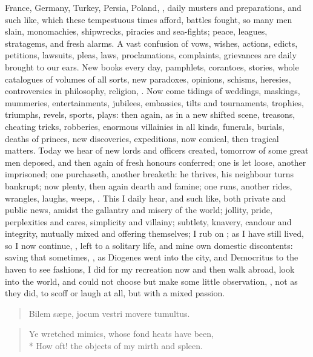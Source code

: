 {France, Germany, Turkey, Persia, Poland, \etc, daily musters and
preparations, and such like, which these tempestuous times afford,
battles fought, so many men slain, monomachies, shipwrecks, piracies
and sea-fights; peace, leagues, stratagems, and fresh alarms. A vast
confusion of vows, wishes, actions, edicts, petitions, lawsuits, pleas,
laws, proclamations, complaints, grievances are daily brought to our
ears. New books every day, pamphlets, corantoes, stories, whole
catalogues of volumes of all sorts, new paradoxes, opinions, schisms,
heresies, controversies in philosophy, religion, \etc. Now come tidings
of weddings, maskings, mummeries, entertainments, jubilees, embassies,
tilts and tournaments, trophies, triumphs, revels, sports, plays: then
again, as in a new shifted scene, treasons, cheating tricks, robberies,
enormous villainies in all kinds, funerals, burials, deaths of princes,
new discoveries, expeditions, now comical, then tragical matters. Today
we hear of new lords and officers created, tomorrow of some great men
deposed, and then again of fresh honours conferred; one is let loose,
another imprisoned; one purchaseth, another breaketh: he thrives, his
neighbour turns bankrupt; now plenty, then again dearth and famine; one
runs, another rides, wrangles, laughs, weeps, \etc. This I daily hear,
and such like, both private and public news, amidst the gallantry and
misery of the world; jollity, pride, perplexities and cares, simplicity
and villainy; subtlety, knavery, candour and integrity, mutually mixed
and offering themselves; I rub on ; as I have still
lived, so I now continue, , left to a solitary life, and
mine own domestic discontents: saving that sometimes, ,
as Diogenes went into the city, and Democritus to the haven to see
fashions, I did for my recreation now and then walk abroad, look into
the world, and could not choose but make some little observation, ,  not as they did, to
scoff or laugh at all, but with a mixed passion.

\begin{verse}
\textlatin{Bilem s\ae{}pe, jocum vestri movere tumultus}.
\end{verse}

\begin{verse}
Ye wretched mimics, whose fond heats have been,\\*
How oft! the objects of my mirth and spleen.
\end{verse}

}

